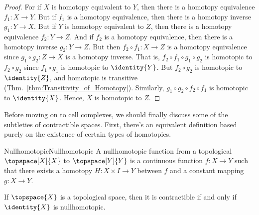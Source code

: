 \documentclass{book}                                                           %
\begin{document}
                \begin{proof}
                    For if $X$ is homotopy equivalent to $Y$, then there is a
                    homotopy equivalence $f_{1}:X\rightarrow{Y}$. But if $f_{1}$
                    is a homotopy equivalence, then there is a homotopy inverse
                    $g_{1}:Y\rightarrow{X}$. But if $Y$ is homotopy equivalent
                    to $Z$, then there is a homotopy equivalence
                    $f_{2}:Y\rightarrow{Z}$. And if $f_{2}$ is a homotopy
                    equivalence, then there is a homotopy inverse
                    $g_{2}:Y\rightarrow{Z}$. But then
                    $f_{2}\circ{f}_{1}:X\rightarrow{Z}$ is a homotopy
                    equivalence since $g_{1}\circ{g}_{2}:Z\rightarrow{X}$ is a
                    homotopy inverse. That is,
                    $f_{2}\circ{f}_{1}\circ{g}_{1}\circ{g}_{2}$ is homotopic to
                    $f_{2}\circ{g}_{2}$ since $f_{1}\circ{g}_{1}$ is homotopic
                    to $\identity{Y}$. But $f_{2}\circ{g}_{2}$ is homotopic to
                    $\identity{Z}$, and homotopic is transitive
                    (Thm.~\ref{thm:Transitivity_of_Homotopy}). Similarly,
                    $g_{1}\circ{g}_{2}\circ{f}_{2}\circ{f}_{1}$ is homotopic to
                    $\identity{X}$. Hence, $X$ is homotopic to $Z$.
                \end{proof}
                Before moving on to cell complexes, we should finally discuss
                some of the subtleties of contractible spaces. First, there's an
                equivalent definition based purely on the existence of certain
                types of homotopies.
                \begin{fdefinition}{Nullhomotopic}{Nullhomotopic}
                    A nullhomotopic function from a topological
                    $\topspace[X]{X}$ to $\topspace[Y]{Y}$ is a continuous
                    function $f:X\rightarrow{Y}$ such that there exists a
                    homotopy $H:X\times{I}\rightarrow{Y}$ between $f$ and a
                    constant mapping $g:X\rightarrow{Y}$.
                \end{fdefinition}
                \begin{theorem}
                    If $\topspace{X}$ is a topological space, then it is
                    contractible if and only if $\identity{X}$ is nullhomotopic.
                \end{theorem}
\end{document}
